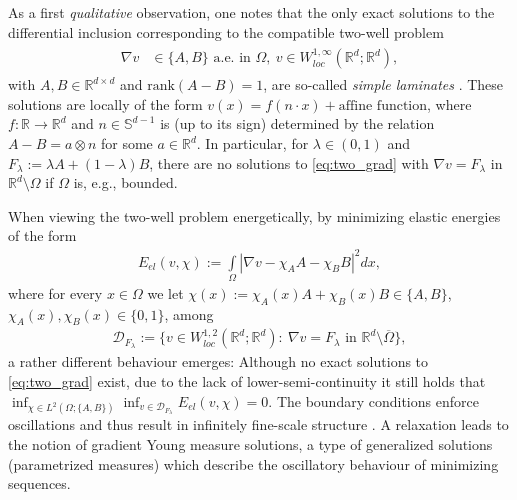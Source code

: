 \documentclass[a4paper, 10pt, twoside, notitlepage]{amsart}
\theoremstyle{plain}
\newcommand{\R}{\mathbb{R}}
\begin{document}
	As a first \emph{qualitative} observation, one notes that the only exact solutions to the differential inclusion corresponding to the compatible two-well problem
	\begin{align}
		\label{eq:two_grad}
		\begin{split}
			\nabla v &\in \{A,B\} \mbox{ a.e. in } \Omega, \ v\in W^{1,\infty}_{loc}(\R^d; \R^d),
		\end{split}
	\end{align}
	with $A,B\in \R^{d \times d}$ and $\text{rank}(A-B)=1$, are so-called \emph{simple laminates}
	\cite{BJ92, M1}. These  solutions are locally of the form $v(x)= f(n\cdot x) + \text{affine function}$, where $f: \R \rightarrow \R^d$ and $n\in \mathbb{S}^{d-1}$ is (up to its sign) determined by the relation $A-B = a\otimes n$ for
	some $a\in \R^d$. In particular, for $\lambda \in (0,1)$ and $F_{\lambda}:= \lambda A + (1-\lambda) B$, there are no solutions to \cref{eq:two_grad} with $\nabla v = F_{\lambda}$ in $\R^d\setminus\Omega$ if $\Omega$ is, e.g., bounded.
	
	When viewing the two-well problem energetically, by minimizing elastic energies of the form
	\begin{align*}
		E_{el}( v, \chi):= \int\limits_{\Omega} |\nabla v - \chi_A A - \chi_B B|^2 dx,
	\end{align*}
	where for every $x\in \Omega$ we let $\chi(x) := \chi_A(x) A + \chi_B(x) B \in \{A,B\}$, $\chi_A(x), \chi_B(x)\in\{0,1\}$, among
	\begin{align*}
		\mathcal{D}_{F_{\lambda}} :=\{v \in W^{1,2}_{loc}(\R^d; \R^d): \ \nabla v = F_{\lambda} \mbox{ in } \R^d \setminus \overline{\Omega}\},
	\end{align*}
	a rather different behaviour emerges: Although no exact solutions to \cref{eq:two_grad} exist, due to the lack of lower-semi-continuity it still holds that
	$\inf_{\chi \in L^2(\Omega;\{A,B\})}\inf_{v \in \mathcal{D}_{F_\lambda}}E_{el}(v,\chi)\allowbreak=0$. The boundary conditions enforce oscillations and thus result in infinitely fine-scale structure \cite{BJ92,M1,B}. A
	relaxation leads to the notion of gradient Young measure solutions, a type of generalized solutions (parametrized measures) which describe the oscillatory behaviour of minimizing sequences.
	
\end{document}
